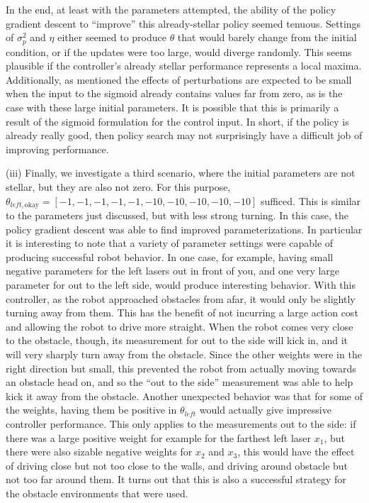 \documentclass{article}
\begin{document}
In the end, at least with the parameters attempted, the ability of the policy gradient descent to ``improve'' this already-stellar policy seemed tenuous.  Settings of $\sigma_p^2$ and $\eta$ either seemed to produce $\theta$ that would barely change from the initial condition, or if the updates were too large, would diverge randomly.  This seems plausible if the controller's already stellar performance represents a local maxima.  Additionally, as mentioned the effects of perturbations are expected to be small when the input to the sigmoid already contains values far from zero, as is the case with these large initial parameters.  It is possible that this is primarily a result of the sigmoid formulation for the control input.  In short, if the policy is already really good, then policy search may not surprisingly have a difficult job of improving performance.

(iii)  Finally, we investigate a third scenario, where the initial parameters are not stellar, but they are also not zero.  For this purpose, $\theta_{left, \text{okay}} = [-1, -1, -1, -1, -1, -10, -10, -10, -10, -10 ]$ sufficed.  This is similar to the parameters just discussed, but with less strong turning.  In this case, the policy gradient descent was able to find improved parameterizations.  In particular it is interesting to note that a variety of parameter settings were capable of producing successful robot behavior.  In one case, for example, having small negative parameters for the left lasers out in front of you, and one very large parameter for out to the left side, would produce interesting behavior.  With this controller, as the robot approached obstacles from afar, it would only be slightly turning away from them.  This has the benefit of not incurring a large action cost and allowing the robot to drive more straight.  When the robot comes very close to the obstacle, though, its measurement for out to the side will kick in, and it will very sharply turn away from the obstacle.  Since the other weights were in the right direction but small, this prevented the robot from actually moving towards an obstacle head on, and so the ``out to the side'' measurement was able to help kick it away from the obstacle.  Another unexpected behavior was that for some of the weights, having them be positive in $\theta_{left}$ would actually give impressive controller performance.  This only applies to the measurements out to the side: if there was a large positive weight for example for the farthest left laser $x_1$, but there were also sizable negative weights for $x_2$ and $x_3$, this would have the effect of driving close but not too close to the walls, and driving around obstacle but not too far around them.  It turns out that this is also a successful strategy for the obstacle environments that were used.
\end{document}
